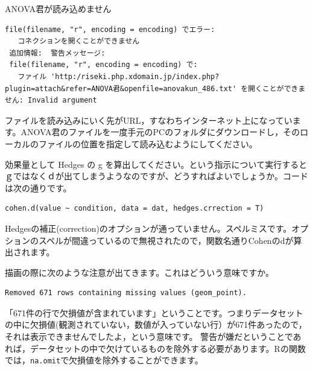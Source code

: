 \documentclass{ltjsbook}
\begin{document}
\begin{FAQ}{ANOVA君が読み込めません}{}
\begin{verbatim}
file(filename, "r", encoding = encoding) でエラー:
   コネクションを開くことができません
 追加情報:  警告メッセージ:
 file(filename, "r", encoding = encoding) で:
   ファイル 'http:/riseki.php.xdomain.jp/index.php?plugin=attach&refer=ANOVA君&openfile=anovakun_486.txt' を開くことができません: Invalid argument
\end{verbatim}
ファイルを読み込みにいく先がURL，すなわちインターネット上になっています。ANOVA君のファイルを一度手元のPCのフォルダにダウンロードし，そのローカルのファイルの位置を指定して読み込むようにしてください。
\end{FAQ}

\begin{FAQ}{効果量として Hedges の g を算出してください。という指示について実行するとｇではなくｄが出てしまうようなのですが、どうすればよいでしょうか。コードは次の通りです。}{}
\begin{verbatim}
cohen.d(value ~ condition, data = dat, hedges.crrection = T)
\end{verbatim}
Hedgesの補正(correction)のオプションが通っていません。スペルミスです。オプションのスペルが間違っているので無視されたので，関数名通りCohenのdが算出されます。
\end{FAQ}


\begin{FAQ}{描画の際に次のような注意が出てきます。これはどういう意味ですか。}{}
\begin{verbatim}Removed 671 rows containing missing values (geom_point).\end{verbatim}
「671件の行で欠損値が含まれています」ということです。つまりデータセットの中に欠損値(観測されていない，数値が入っていない行）が671件あったので，それは表示できませんでしたよ，という意味です。
警告が嫌だということであれば，データセットの中で欠けているものを除外する必要があります。Rの関数では，\verb|na.omit|で欠損値を除外することができます。
\end{FAQ}
\end{document}
